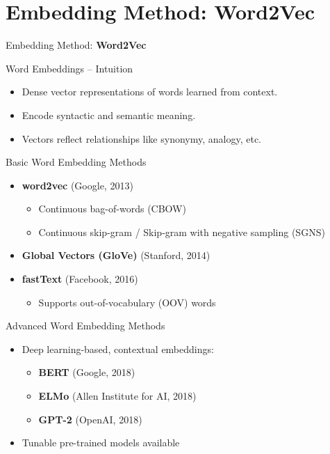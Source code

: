 \section{Embedding Method: Word2Vec}
\begin{frame}{}
    \LARGE Embedding Method: \textbf{Word2Vec}
\end{frame}

\begin{frame}{Word Embeddings – Intuition}
    \begin{itemize}
        \item Dense vector representations of words learned from context.
        \item Encode syntactic and semantic meaning.
        \item Vectors reflect relationships like synonymy, analogy, etc.
    \end{itemize}
\end{frame}

\begin{frame}{Basic Word Embedding Methods}
    \begin{itemize}
        \item \textbf{word2vec} (Google, 2013)
        \begin{itemize}
            \item Continuous bag-of-words (CBOW)
            \item Continuous skip-gram / Skip-gram with negative sampling (SGNS)
        \end{itemize}
        \item \textbf{Global Vectors (GloVe)} (Stanford, 2014)
        \item \textbf{fastText} (Facebook, 2016)
        \begin{itemize}
            \item Supports out-of-vocabulary (OOV) words
        \end{itemize}
    \end{itemize}
\end{frame}

\begin{frame}{Advanced Word Embedding Methods}
    \begin{itemize}
        \item Deep learning-based, contextual embeddings:
        \begin{itemize}
            \item \textbf{BERT} (Google, 2018)
            \item \textbf{ELMo} (Allen Institute for AI, 2018)
            \item \textbf{GPT-2} (OpenAI, 2018)
        \end{itemize}
        \item Tunable pre-trained models available
    \end{itemize}
\end{frame}

